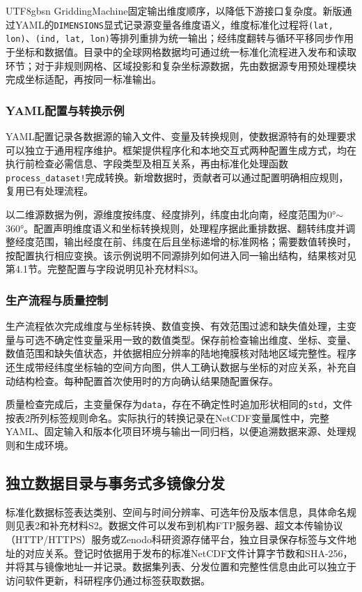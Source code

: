 \documentclass[numdoi]{chinese}
\begin{document}
\begin{CJK}{UTF8}{gbsn}
GriddingMachine固定输出维度顺序，以降低下游接口复杂度。新版通过YAML的\nolinkurl{DIMENSIONS}显式记录源变量各维度语义，维度标准化过程将\nolinkurl{(lat, lon)}、\nolinkurl{(ind, lat, lon)}等排列重排为统一输出；经纬度翻转与循环平移同步作用于坐标和数据值。目录中的全球网格数据均可通过统一标准化流程进入发布和读取环节；对于非规则网格、区域投影和复杂坐标源数据，先由数据源专用预处理模块完成坐标适配，再按同一标准输出。

\subsubsection{YAML配置与转换示例}
YAML配置记录各数据源的输入文件、变量及转换规则，使数据源特有的处理要求可以独立于通用程序维护。框架提供程序化和本地交互式两种配置生成方式，均在执行前检查必需信息、字段类型及相互关系，再由标准化处理函数\nolinkurl{process_dataset!}完成转换。新增数据时，贡献者可以通过配置明确相应规则，复用已有处理流程。

以二维源数据为例，源维度按纬度、经度排列，纬度由北向南，经度范围为0°\ensuremath{\sim}360°。配置声明维度语义和坐标转换规则，处理程序据此重排数据、翻转纬度并调整经度范围，输出经度在前、纬度在后且坐标递增的标准网格；需要数值转换时，按配置执行相应变换。该示例说明不同源排列如何进入同一输出结构，结果核对见第4.1节。完整配置与字段说明见补充材料S3。

\subsubsection{生产流程与质量控制}
生产流程依次完成维度与坐标转换、数值变换、有效范围过滤和缺失值处理，主变量与可选不确定性变量采用一致的数值类型。保存前检查输出维度、坐标、变量、数值范围和缺失值状态，并依据相应分辨率的陆地掩膜核对陆地区域完整性。程序还生成带经纬度坐标轴的空间方向图，供人工确认数据与坐标的对应关系，补充自动结构检查。每种配置首次使用时的方向确认结果随配置保存。

质量检查完成后，主变量保存为\nolinkurl{data}，存在不确定性时追加形状相同的\nolinkurl{std}，文件按表2所列标签规则命名。实际执行的转换记录在NetCDF变量属性中，完整YAML、固定输入和版本化项目环境与输出一同归档，以便追溯数据来源、处理规则和生成环境。

\subsection{独立数据目录与事务式多镜像分发}
标准化数据标签表达类别、空间与时间分辨率、可选年份及版本信息，具体命名规则见表2和补充材料S2。数据文件可以发布到机构FTP服务器、超文本传输协议（HTTP/HTTPS）服务或Zenodo科研资源存储平台，独立目录保存标签与文件地址的对应关系。登记时依据用于发布的标准NetCDF文件计算字节数和SHA-256，并将其与镜像地址一并记录。数据集列表、分发位置和完整性信息由此可以独立于访问软件更新，科研程序仍通过标签获取数据。


\end{CJK}
\end{document}
